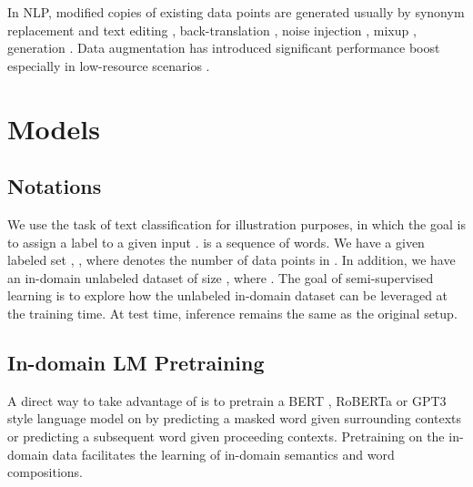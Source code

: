 \documentclass[11pt,a4paper]{article}
\begin{document}
In NLP, 
 modified copies of  existing data points
are generated usually by 
 synonym replacement and text editing \citep{zhang2015character,kobayashi2018contextual,wei2019eda,gao-etal-2019-soft}, back-translation \citep{sennrich2016back-translation,edunov2018understanding,xie2019unsupervised}, noise injection \citep{wang-yang-2015-thats,xie2017data,xie2018noising}, mixup \citep{guo2019augmenting}, generation \citep{anabytavor2019data,wu2019conditional,kumar2020data}.
  Data augmentation has introduced significant performance boost  especially in low-resource scenarios \citep{fadaee2017data,bergmanis2017training,sahin-steedman-2018-data,xia-etal-2019-generalized,shleifer2019low,singh2019xlda}.





\section{Models}
\begin{comment}
This section introduces our designs of  semi-supervised approaches for NLP tasks. 
We introduce two approaches, different in how the augmented dataset is harvested: 
(1) the model-based approach, in which data is harvested based on the prediction of a trained model; and 
(2) semantic-based approach, in which data is harvested based on semantic relatedness. 
\end{comment}

\subsection{Notations}
We use the task of text  classification 
for illustration purposes, in which the goal is to assign a label  to a given  input .  is a sequence of words. 
We have a given labeled set , , where  denotes the number of data points  in . 
In addition, we have an  
in-domain
unlabeled dataset  of size , where  .
The goal of semi-supervised learning is to explore how the unlabeled 
in-domain
dataset  can be leveraged at the training time. 
At test time, inference remains the same as the original setup. 
\subsection{In-domain LM Pretraining}
A direct way to take  advantage of 
 is to  pretrain  a BERT \citep{devlin2018bert}, RoBERTa \citep{yinhan2019roberta} or GPT3 \citep{brown2020language} style language model
on 
 by predicting a masked word given surrounding contexts or 
 predicting
 a subsequent word given proceeding contexts. 
 Pretraining on the in-domain data  
facilitates the learning of in-domain   
semantics and word compositions. 
\end{document}
